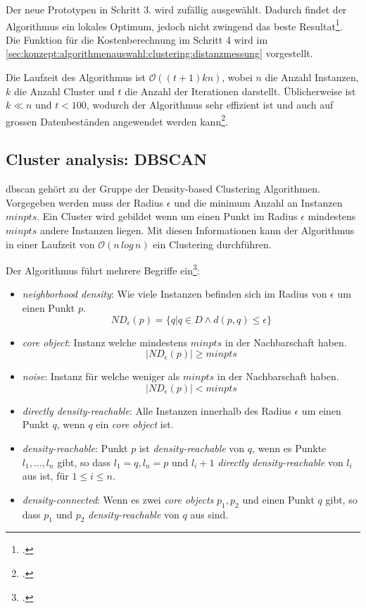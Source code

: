 Der neue Prototypen in Schritt 3. wird zufällig ausgewählt. Dadurch findet der Algorithmus ein lokales Optimum, jedoch nicht zwingend das beste Resultat\footcite{data_mining_concepts_and_techniques}.
Die Funktion für die Kostenberechnung im Schritt 4 wird im \cref{sec:konzept:algorithmenauswahl:clustering:distanzmessung} vorgestellt.

Die Laufzeit des Algorithmus ist $\mathcal{O}((t+1)kn)$, wobei $n$ die Anzahl Instanzen, $k$ die Anzahl Cluster und $t$ die Anzahl der Iterationen darstellt. Üblicherweise ist $k \ll n$ und $t < 100$, wodurch der Algorithmus sehr effizient ist und auch auf grossen Datenbeständen angewendet werden kann\footcite{clustering_numeric_and_categorical_values}.

\subsection{Cluster analysis: DBSCAN}
\label{sec:recherche:algorithmen:dbscan}
\gls{dbscan} gehört zu der Gruppe der Density-based Clustering Algorithmen. 
Vorgegeben werden muss der Radius $\epsilon$ und die minimum Anzahl an Instanzen $minpts$. Ein Cluster wird gebildet wenn um einen Punkt im Radius $\epsilon$ mindestens $minpts$ andere Instanzen liegen. Mit diesen Informationen kann der Algorithmus in einer Laufzeit von $\mathcal{O}(n\,log\,n)$ ein Clustering durchführen.

Der Algorithmus führt mehrere Begriffe ein\footcite{data_mining_concepts_and_techniques}:
\begin{itemize}
	\item \textit{neighborhood density}: Wie viele Instanzen befinden sich im Radius von $\epsilon$ um einen Punkt $p$. 
	\begin{equation}
	\mathit{ND}_{\epsilon}(p) = \{q | q \in D \wedge d(p,q) \leq \epsilon\}
	\end{equation}
	\item \textit{core object}: Instanz welche mindestens $minpts$ in der Nachbarschaft haben.
	\begin{equation}
	|\mathit{ND}_{\epsilon}(p)| \geq minpts
	\end{equation}
	\item \textit{noise}: Instanz für welche weniger als $minpts$ in der Nachbarschaft haben.
	\begin{equation}
	|\mathit{ND}_{\epsilon}(p)| < minpts
	\end{equation}
	\item \textit{directly density-reachable}: Alle Instanzen innerhalb des Radius $\epsilon$ um einen Punkt $q$, wenn $q$ ein \textit{core object} ist.
	\item \textit{density-reachable}: Punkt $p$ ist \textit{density-reachable} von $q$, wenn es Punkte $l_1,...,l_n$ gibt, so dass $l_1=q, l_n=p$ und $l_i+1$ \textit{directly density-reachable} von $l_i$ aus ist, für $1 \leq i \leq n$.
	\item \textit{density-connected}: Wenn es zwei \textit{core objects} $p_1,p_2$ und einen Punkt $q$ gibt, so dass $p_1$ und $p_2$ \textit{density-reachable} von $q$ aus sind.
\end{itemize}

